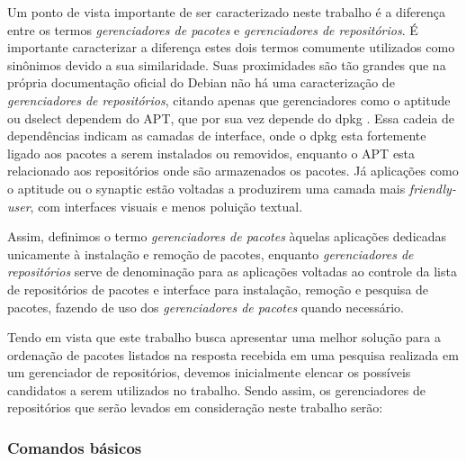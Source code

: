 
Um ponto de vista importante de ser caracterizado neste trabalho é a diferença entre os termos \textit{ gerenciadores de pacotes} e \textit{gerenciadores de repositórios}.
É importante caracterizar a diferença estes dois termos comumente utilizados como sinônimos devido a sua similaridade. Suas proximidades são tão grandes que na própria documentação oficial do Debian não há uma caracterização de \textit{gerenciadores de repositórios}, citando apenas que gerenciadores como o {\code aptitude} ou {\code dselect} dependem do {\code APT}, que por sua vez depende do {\code dpkg} \cite{debian-faq}. Essa cadeia de dependências indicam as camadas de interface, onde o {\code dpkg} esta fortemente ligado aos pacotes a serem instalados ou removidos, enquanto o {\code APT} esta relacionado aos repositórios onde são armazenados os pacotes. Já aplicações como o {\code aptitude} ou o {\code synaptic} estão voltadas a produzirem uma camada mais \textit{friendly-user}, com interfaces visuais e menos poluição textual.

Assim, definimos o termo \textit{gerenciadores de pacotes} àquelas aplicações dedicadas unicamente à instalação e remoção de pacotes, enquanto \textit{gerenciadores de repositórios} serve de denominação para as aplicações voltadas ao controle da lista de repositórios de pacotes e interface  para instalação, remoção e pesquisa de pacotes, fazendo de uso dos \textit{gerenciadores de pacotes} quando necessário.

Tendo em vista que este trabalho busca apresentar uma melhor solução para a ordenação de pacotes listados na resposta recebida em uma pesquisa realizada em um gerenciador de repositórios, devemos inicialmente elencar os possíveis candidatos a serem utilizados no trabalho.
Sendo assim, os gerenciadores de repositórios que serão levados em consideração neste trabalho serão:







\subsubsection{Comandos básicos} %
\label{subs:comandos_basicos}

